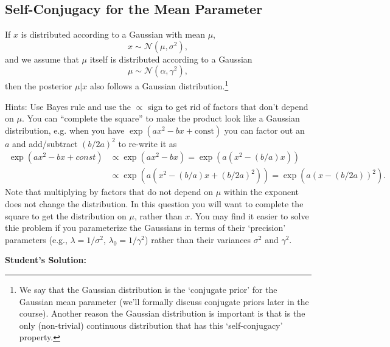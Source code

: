 \documentclass{article}
\begin{document}
\subsection{Self-Conjugacy for the Mean Parameter}

If $x$ is distributed according to a Gaussian with mean $\mu$,
\[
x \sim \mathcal{N}(\mu,\sigma^2),
\]
and we assume that $\mu$ itself is distributed according to a Gaussian
\[
\mu \sim \mathcal{N}(\alpha,\gamma^2),
\]
then the posterior $\mu | x$ also follows a Gaussian distribution.\footnote{We say that the Gaussian distribution is the `conjugate prior' for the Gaussian mean parameter (we'll formally discuss conjugate priors later in the course). Another reason the Gaussian distribution is important is that is the only (non-trivial) continuous distribution that has this `self-conjugacy' property.}  %

Hints: Use Bayes rule and use the $\propto$ sign to get rid of factors that don't depend on $\mu$. You can ``complete the square'' to make the product look like a Gaussian distribution, e.g. when you have $\exp(ax^2 - bx + \text{const})$ you can factor out an $a$ and add/subtract $(b/2a)^2$ to re-write it as
\begin{align*}
\exp\left(ax^2 - bx + const\right) & \propto
\exp\left(ax^2 - bx\right) = \exp\left(a(x^2 - (b/a)x)\right) \\& \propto \exp\left(a(x^2 - (b/a)x + (b/2a)^2)\right) =  \exp\left(a(x - (b/2a))^2\right).
\end{align*}
Note that multiplying by factors that do not depend on $\mu$ within the exponent does not change the distribution. In this question you will want to complete the square to get the distribution on $\mu$, rather than $x$.
You may find it easier to solve thie problem if you parameterize the Gaussians in terms of their `precision' parameters (e.g., $\lambda = 1/\sigma^2$, $\lambda_0 = 1/\gamma^2$) rather than their variances $\sigma^2$ and $\gamma^2$.

\textbf{Student's Solution:}
\end{document}

